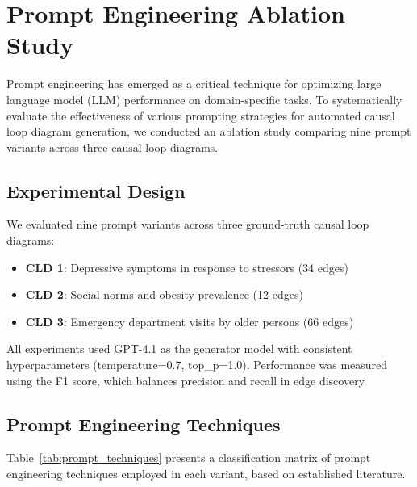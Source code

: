 \section{Prompt Engineering Ablation Study}
\label{sec:ablation_edge}

Prompt engineering has emerged as a critical technique for optimizing large language model (LLM) performance on domain-specific tasks. To systematically evaluate the effectiveness of various prompting strategies for automated causal loop diagram generation, we conducted an ablation study comparing nine prompt variants across three causal loop diagrams.

\subsection{Experimental Design}

We evaluated nine prompt variants across three ground-truth causal loop diagrams:
\begin{itemize}[noitemsep]
    \item \textbf{CLD 1}: Depressive symptoms in response to stressors (34 edges)
    \item \textbf{CLD 2}: Social norms and obesity prevalence (12 edges)
    \item \textbf{CLD 3}: Emergency department visits by older persons (66 edges)
\end{itemize}

All experiments used GPT-4.1 as the generator model with consistent hyperparameters (temperature=0.7, top\_p=1.0). Performance was measured using the F1 score, which balances precision and recall in edge discovery.

\subsection{Prompt Engineering Techniques}

Table~\ref{tab:prompt_techniques} presents a classification matrix of prompt engineering techniques employed in each variant, based on established literature.

